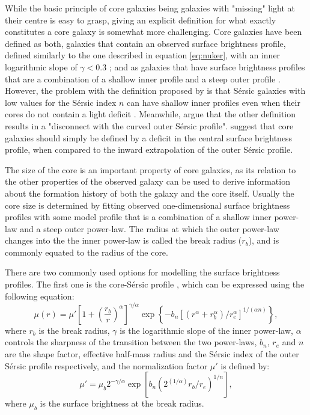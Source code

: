 \documentclass[english, twoside]{HYgradu}
\begin{document}
While the basic principle of core galaxies being galaxies with "missing" light at their centre is easy to grasp, giving an explicit definition for what exactly constitutes a core galaxy is somewhat more challenging. Core galaxies have been defined as both, galaxies that contain an observed surface brightness profile, defined similarly to the one described in equation \ref{eq:nuker}, with an inner logarithmic slope of $\gamma < 0.3$ \citep{Lauer1995, Lauer2007}; and as galaxies that have surface brightness profiles that are a combination of a shallow inner profile and a steep outer profile \citep{Kormendy1999}. However, the problem with the definition proposed by \cite{Lauer1995} is that Sérsic galaxies with low values for the Sérsic index $n$ can have shallow inner profiles even when their cores do not contain a light deficit \citep{Graham2003}. Meanwhile, \cite{Dullo2012} argue that the other definition results in a "disconnect with the curved outer Sérsic profile". \cite{Graham2003} suggest that core galaxies should simply be defined by a deficit in the central surface brightness profile, when compared to the inward extrapolation of the outer Sérsic profile.

The size of the core is an important property of core galaxies, as its relation to the other properties of the observed galaxy can be used to derive information about the formation history of both the galaxy and the core itself. Usually the core size is determined by fitting observed one-dimensional surface brightness profiles with some model profile that is a combination of a shallow inner power-law and a steep outer power-law. The radius at which the outer power-law changes into the the inner power-law is called the break radius ($r_b$), and is commonly equated to the radius of the core.

There are two commonly used options for modelling the surface brightness profiles. The first one is the core-Sérsic profile \citep{Graham2003}, which can be expressed using the following equation:
\begin{equation}
\mu(r) = \mu' \left[ 1 + \left( \frac{r_b}{r} \right)^\alpha \right]^{\gamma / \alpha} \exp \left\lbrace -b_n \left[ \left( r^\alpha + r_b^\alpha \right) / r_e^\alpha \right]^{1/(\alpha n)} \right\rbrace, \label{eq:core-sersic}
\end{equation}
where $r_b$ is the break radius, $\gamma$ is the logarithmic slope of the inner power-law, $\alpha$ controls the sharpness of the transition between the two power-laws, $b_n$, $r_e$ and $n$ are the shape factor, effective half-mass radius and the Sérsic index of the outer Sérsic profile respectively, and the normalization factor $\mu'$ is defined by:
\begin{equation}
\mu' = \mu_b 2^{-\gamma/\alpha} \exp \left[ b_n \left( 2^{(1/\alpha)} r_b/r_e \right)^{1/n} \right], 
\label{eq:mu_dot}
\end{equation}
where $\mu_b$ is the surface brightness at the break radius. 
\end{document}
